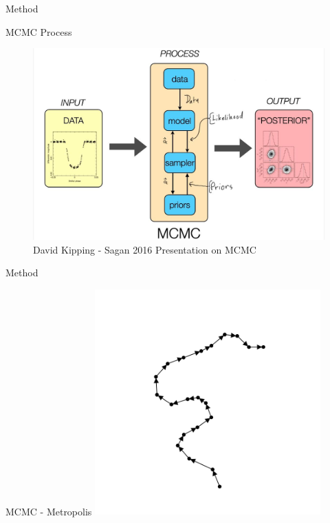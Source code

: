 \documentclass[t,10pt,fleqn]{beamer}
\begin{document}
\begin{frame}{Method}
	\vspace{-.3cm}
	\begin{block}{MCMC Process}
		\centering
		\begin{figure}
			\includegraphics[width=0.9\linewidth]{mcmc-diag-kipping}
			\caption{David Kipping - Sagan 2016 Presentation on MCMC}
		\end{figure}
	\end{block}
\end{frame}

\begin{frame}{Method}
	\vspace{-.3cm}
	\centering
	\begin{block}{MCMC - Metropolis}
		\includegraphics[width=0.65\textwidth]{mcmc-start}
	\end{block}
\end{frame}
\end{document}
